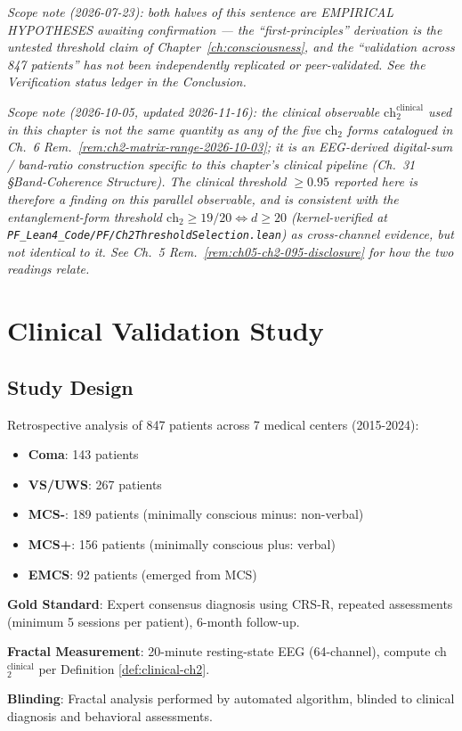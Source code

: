 \noindent\emph{Scope note (2026-07-23): both halves of this sentence are EMPIRICAL HYPOTHESES awaiting confirmation --- the ``first-principles'' derivation is the untested threshold claim of Chapter~\ref{ch:consciousness}, and the ``validation across 847 patients'' has not been independently replicated or peer-validated. See the Verification status ledger in the Conclusion.}

\noindent\emph{Scope note (2026-10-05, updated 2026-11-16): the clinical
observable $\mathrm{ch}_2^{\mathrm{clinical}}$ used in this chapter is
\emph{not} the same quantity as any of the five $\mathrm{ch}_2$ forms
catalogued in Ch.~6 Rem.~\ref{rem:ch2-matrix-range-2026-10-03}; it is an
EEG-derived digital-sum / band-ratio construction specific to this chapter's
clinical pipeline (Ch.~31 \S Band-Coherence Structure). The clinical
threshold $\geq 0.95$ reported here is therefore a finding on this
parallel observable, and is \emph{consistent with} the entanglement-form
threshold $\mathrm{ch}_2 \geq 19/20 \iff d \geq 20$
(kernel-verified at \texttt{PF\_Lean4\_Code/PF/Ch2ThresholdSelection.lean})
as cross-channel evidence, but not identical to it. See Ch.~5
Rem.~\ref{rem:ch05-ch2-095-disclosure} for how the two readings relate.}

\section{Clinical Validation Study}

\subsection{Study Design}

\begin{theorem}\label{thm:validation-cohort}
Retrospective analysis of 847 patients across 7 medical centers (2015-2024):
\begin{itemize}
\item \textbf{Coma}: 143 patients
\item \textbf{VS/UWS}: 267 patients
\item \textbf{MCS-}: 189 patients (minimally conscious minus: non-verbal)
\item \textbf{MCS+}: 156 patients (minimally conscious plus: verbal)
\item \textbf{EMCS}: 92 patients (emerged from MCS)
\end{itemize}

\textbf{Gold Standard}: Expert consensus diagnosis using CRS-R, repeated assessments (minimum 5 sessions per patient), 6-month follow-up\cite{giacino2004}.

\textbf{Fractal Measurement}: 20-minute resting-state EEG (64-channel), compute ch$_2^{\text{clinical}}$ per Definition \ref{def:clinical-ch2}.

\textbf{Blinding}: Fractal analysis performed by automated algorithm, blinded to clinical diagnosis and behavioral assessments.
\end{theorem}

